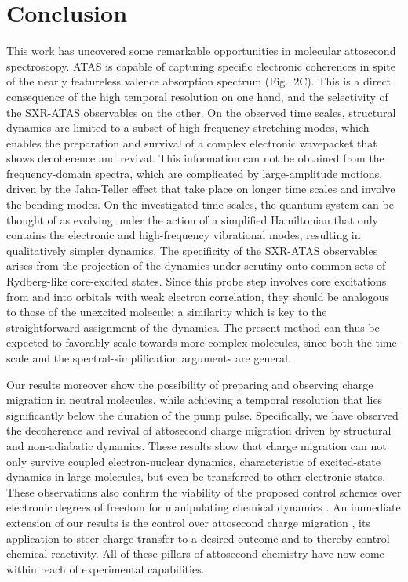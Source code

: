\documentclass[12pt]{article}
\begin{document}
\section{Conclusion}

This work has uncovered some remarkable opportunities in molecular attosecond spectroscopy. ATAS is capable of capturing specific electronic coherences in spite of the nearly featureless valence absorption spectrum (Fig.~2C). This is a direct consequence of the high temporal resolution on one hand, and the selectivity of the SXR-ATAS observables on the other. On the observed time scales, structural dynamics are limited to a subset of high-frequency stretching modes, which enables the preparation and survival of a complex electronic wavepacket that shows decoherence and revival. This information can not be obtained from the frequency-domain spectra, which are complicated by large-amplitude motions, driven by the Jahn-Teller effect that take place on longer time scales and involve the bending modes. On the investigated time scales, the quantum system can be thought of as evolving under the action of a simplified Hamiltonian that only contains the electronic and high-frequency vibrational modes, resulting in qualitatively simpler dynamics. The specificity of the SXR-ATAS observables arises from the projection of the dynamics under scrutiny onto common sets of Rydberg-like core-excited states. Since this probe step involves core excitations from and into orbitals with weak electron correlation, they should be analogous to those of the unexcited molecule; a similarity which is key to the straightforward assignment of the dynamics. The present method can thus be expected to favorably scale towards more complex molecules, since both the time-scale and the spectral-simplification arguments are general. 

Our results moreover show the possibility of preparing and observing charge migration in neutral molecules, while achieving a temporal resolution that lies significantly below the duration of the pump pulse. Specifically, we have observed the decoherence and revival of attosecond charge migration driven by structural and non-adiabatic dynamics. These results show that charge migration can not only survive coupled electron-nuclear dynamics, characteristic of excited-state dynamics in large molecules, but even be transferred to other electronic states. These observations also confirm the viability of the proposed control schemes over electronic degrees of freedom for manipulating chemical dynamics \cite{kling13a}. An immediate extension of our results is the control over attosecond charge migration \cite{golubev15a}, its application to steer charge transfer to a desired outcome and to thereby control chemical reactivity. All of these pillars of attosecond chemistry have now come within reach of experimental capabilities.
\end{document}
